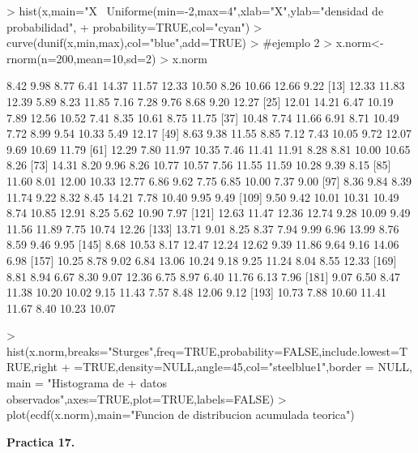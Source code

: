 \documentclass{article}
\begin{document}
\begin{Schunk}
\begin{Sinput}
> hist(x,main="X ~Uniforme(min=-2,max=4",xlab="X",ylab="densidad de probabilidad",
+ probability=TRUE,col="cyan")
> curve(dunif(x,min,max),col="blue",add=TRUE)
> #ejemplo 2
> x.norm<-rnorm(n=200,mean=10,sd=2)
> x.norm
\end{Sinput}
\begin{Soutput}
  [1]  8.42  9.98  8.77  6.41 14.37 11.57 12.33 10.50  8.26 10.66 12.66  9.22
 [13] 12.33 11.83 12.39  5.89  8.23 11.85  7.16  7.28  9.76  8.68  9.20 12.27
 [25] 12.01 14.21  6.47 10.19  7.89 12.56 10.52  7.41  8.35 10.61  8.75 11.75
 [37] 10.48  7.74 11.66  6.91  8.71 10.49  7.72  8.99  9.54 10.33  5.49 12.17
 [49]  8.63  9.38 11.55  8.85  7.12  7.43 10.05  9.72 12.07  9.69 10.69 11.79
 [61] 12.29  7.80 11.97 10.35  7.46 11.41 11.91  8.28  8.81 10.00 10.65  8.26
 [73] 14.31  8.20  9.96  8.26 10.77 10.57  7.56 11.55 11.59 10.28  9.39  8.15
 [85] 11.60  8.01 12.00 10.33 12.77  6.86  9.62  7.75  6.85 10.00  7.37  9.00
 [97]  8.36  9.84  8.39 11.74  9.22  8.32  8.45 14.21  7.78 10.40  9.95  9.49
[109]  9.50  9.42 10.01 10.31 10.49  8.74 10.85 12.91  8.25  5.62 10.90  7.97
[121] 12.63 11.47 12.36 12.74  9.28 10.09  9.49 11.56 11.89  7.75 10.74 12.26
[133] 13.71  9.01  8.25  8.37  7.94  9.99  6.96 13.99  8.76  8.59  9.46  9.95
[145]  8.68 10.53  8.17 12.47 12.24 12.62  9.39 11.86  9.64  9.16 14.06  6.98
[157] 10.25  8.78  9.02  6.84 13.06 10.24  9.18  9.25 11.24  8.04  8.55 12.33
[169]  8.81  8.94  6.67  8.30  9.07 12.36  6.75  8.97  6.40 11.76  6.13  7.96
[181]  9.07  6.50  8.47 11.38 10.20 10.02  9.15 11.43  7.57  8.48 12.06  9.12
[193] 10.73  7.88 10.60 11.41 11.67  8.40 10.23 10.07
\end{Soutput}
\begin{Sinput}
> hist(x.norm,breaks="Sturges",freq=TRUE,probability=FALSE,include.lowest=TRUE,right
+ =TRUE,density=NULL,angle=45,col="steelblue1",border = NULL, main = "Histograma de
+ datos observados",axes=TRUE,plot=TRUE,labels=FALSE)
> plot(ecdf(x.norm),main="Funcion de distribucion acumulada teorica")
\end{Sinput}
\end{Schunk}

\textbf{Practica 17.}
\end{document}
